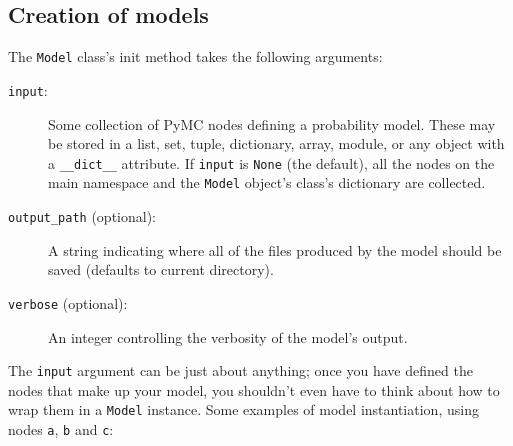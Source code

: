 \subsection*{Creation of models} \label{sec:ModelInstantiation}
The \texttt{Model} class's init method takes the following arguments:
\begin{description}
    \item[\texttt{input}:] Some collection of PyMC nodes defining a probability model. These may be stored in a list, set, tuple, dictionary, array, module, or any object with a \texttt{__dict__} attribute. If \texttt{input} is \texttt{None} (the default), all the nodes on the main namespace and the \texttt{Model} object's class's dictionary are collected.
    \item[\texttt{output_path} (optional):] A string indicating where all of the files produced by the model should be saved (defaults to current directory).
    \item[\texttt{verbose} (optional):] An integer controlling the verbosity of the model's output.
\end{description}
The \texttt{input} argument can be just about anything; once you have defined the nodes that make up your model, you shouldn't even have to think about how to wrap them in a \texttt{Model} instance. Some examples of model instantiation, using nodes \texttt{a}, \texttt{b} and \texttt{c}:
